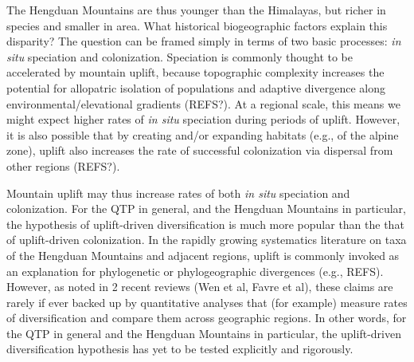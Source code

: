 The Hengduan Mountains are thus younger than the Himalayas, but richer in species and smaller in area. What historical biogeographic factors explain this disparity? The question can be framed simply in terms of two basic processes: \textit{in situ} speciation and colonization. Speciation is commonly thought to be accelerated by mountain uplift, because topographic complexity increases the potential for allopatric isolation of populations and adaptive divergence along environmental/elevational gradients (REFS?). At a regional scale, this means we might expect higher rates of \textit{in situ} speciation during periods of uplift. However, it is also possible that by creating and/or expanding habitats (e.g., of the alpine zone), uplift also increases the rate of successful colonization via dispersal from other regions (REFS?).

Mountain uplift may thus increase rates of both \textit{in situ} speciation and colonization. For the QTP in general, and the Hengduan Mountains in particular, the hypothesis of uplift-driven diversification is much more popular than the that of uplift-driven colonization. In the rapidly growing systematics literature on taxa of the Hengduan Mountains and adjacent regions, uplift is commonly invoked as an explanation for phylogenetic or phylogeographic divergences (e.g., REFS). However, as noted in 2 recent reviews (Wen et al, Favre et al), these claims are rarely if ever backed up by quantitative analyses that (for example) measure rates of diversification and compare them across geographic regions. In other words, for the QTP in general and the Hengduan Mountains in particular, the uplift-driven diversification hypothesis has yet to be tested explicitly and rigorously.




